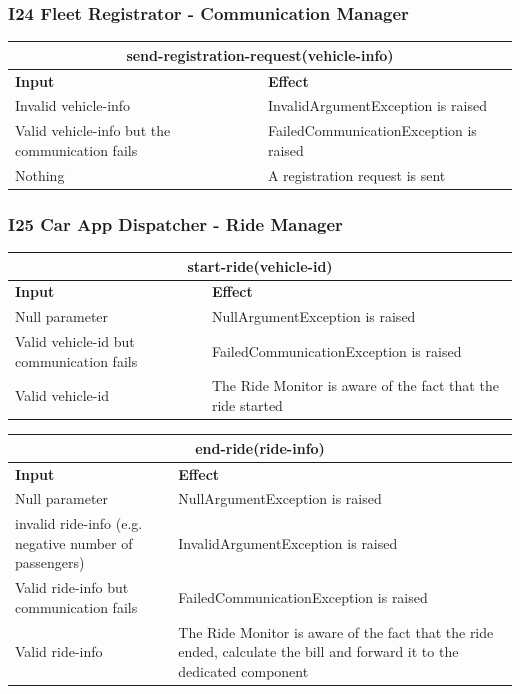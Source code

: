 \documentclass{article}
\begin{document}
\subsubsection{I24 Fleet Registrator - Communication Manager}
\begin{tabular}{ |p{5cm}|p{7cm}| }
  \hline
  \multicolumn{2}{|c|}{send-registration-request(vehicle-info)} \\
  \hline
  \textbf{Input} & \textbf{Effect} \\
  \hline
  Invalid vehicle-info & InvalidArgumentException is raised\\
  \hline
  Valid vehicle-info but the communication fails & FailedCommunicationException is raised\\
  \hline
  Nothing & A registration request is sent\\
  \hline
\end{tabular}
\subsubsection{I25 Car App Dispatcher - Ride Manager}
\begin{tabular}{ |p{5cm}|p{7cm}| }
  \hline
  \multicolumn{2}{|c|}{start-ride(vehicle-id)} \\
  \hline
  \textbf{Input} & \textbf{Effect} \\
  \hline
   Null parameter & NullArgumentException is raised\\
  \hline
  Valid vehicle-id but communication fails & FailedCommunicationException is raised\\
  \hline
 Valid vehicle-id & The Ride Monitor is aware of the fact that the ride started \\
  \hline
\end{tabular}
\begin{tabular}{ |p{5cm}|p{7cm}| }
  \hline
  \multicolumn{2}{|c|}{end-ride(ride-info)} \\
  \hline
  \textbf{Input} & \textbf{Effect} \\
  \hline
   Null parameter & NullArgumentException is raised\\
  \hline
  invalid ride-info (e.g. negative number of passengers) & InvalidArgumentException is raised\\
  \hline
  Valid ride-info but communication fails & FailedCommunicationException is raised\\
  \hline
 Valid ride-info & The Ride Monitor is aware of the fact that the ride ended, calculate the bill and forward it to the dedicated component \\
  \hline
\end{tabular}
\end{document}

